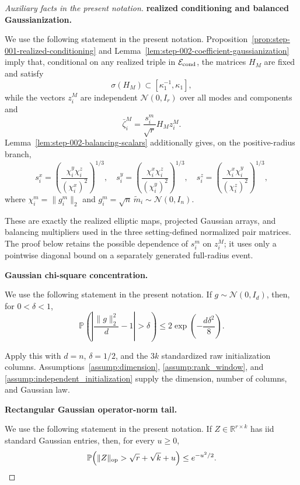 \begin{proof}[Auxiliary facts in the present notation]


\medskip\noindent\textbf{realized conditioning and balanced Gaussianization.}\par

We use the following statement in the present notation. Proposition~\ref{prop:step-001-realized-conditioning} and
Lemma~\ref{lem:step-002-coefficient-gaussianization} imply that, conditional
on any realized triple in \(\mathcal E_{\rm cond}\), the matrices \(H_M\)
are fixed and satisfy
\[
  \sigma(H_M)\subset[\kappa_1^{-1},\kappa_1],
\]
while the vectors \(z_i^M\) are independent \(\mathcal N(0,I_r)\) over all
modes and components and
\[
  \bar\zeta_i^M=\frac{s_i^m}{\sqrt r}H_Mz_i^M.
\]
Lemma~\ref{lem:step-002-balancing-scalars} additionally gives, on
the positive-radius branch,
\[
  s_i^x=\left(\frac{\chi_i^y\chi_i^z}{(\chi_i^x)^2}\right)^{1/3},\quad
  s_i^y=\left(\frac{\chi_i^x\chi_i^z}{(\chi_i^y)^2}\right)^{1/3},\quad
  s_i^z=\left(\frac{\chi_i^x\chi_i^y}{(\chi_i^z)^2}\right)^{1/3},
\]
where \(\chi_i^m=\|g_i^m\|_2\) and
\(g_i^m=\sqrt n\,\widetilde m_i\sim\mathcal N(0,I_n)\).

These are exactly the realized
elliptic maps, projected Gaussian arrays, and balancing multipliers used in
the three setting-defined normalized pair matrices. The proof below retains
the possible dependence of \(s_i^m\) on \(z_i^M\); it uses only a pointwise
diagonal bound on a separately generated full-radius event.


\medskip\noindent\textbf{Gaussian chi-square concentration.}\par

We use the following statement in the present notation. If \(g\sim\mathcal N(0,I_d)\), then, for
\(0<\delta<1\),
\[
  \mathbb P\!\left(\left|\frac{\|g\|_2^2}{d}-1\right|>\delta\right)
  \le 2\exp\!\left(-\frac{d\delta^2}{8}\right).
\]

Apply this with \(d=n\),
\(\delta=1/2\), and the \(3k\) standardized raw initialization columns.
Assumptions~\ref{assump:dimension}, \ref{assump:rank_window}, and
\ref{assump:independent_initialization} supply the dimension, number of
columns, and Gaussian law.


\medskip\noindent\textbf{Rectangular Gaussian operator-norm tail.}\par

We use the following statement in the present notation. If \(Z\in\mathbb R^{r\times k}\) has iid standard
Gaussian entries, then, for every \(u\ge0\),
\[
  \mathbb P\!\left(\|Z\|_{\rm op}>\sqrt r+\sqrt k+u\right)
  \le e^{-u^2/2}.
\]


\end{proof}
